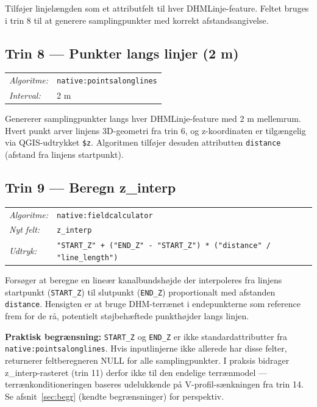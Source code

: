 \medskip
Tilføjer linjelængden som et attributfelt til hver DHMLinje-feature. Feltet
bruges i trin 8 til at generere samplingpunkter med korrekt afstandsangivelse.

\subsection{Trin 8 — Punkter langs linjer (2 m)}

\begin{tabular}{ll}
  \textit{Algoritme:} & \texttt{native:pointsalonglines} \\
  \textit{Interval:}  & 2 m \\
\end{tabular}

\medskip
Genererer samplingpunkter langs hver DHMLinje-feature med 2 m mellemrum.
Hvert punkt arver linjens 3D-geometri fra trin 6, og z-koordinaten er
tilgængelig via QGIS-udtrykket \texttt{\$z}. Algoritmen tilføjer desuden
attributten \texttt{distance} (afstand fra linjens startpunkt).

\subsection{Trin 9 — Beregn z\_interp}

\begin{tabular}{ll}
  \textit{Algoritme:} & \texttt{native:fieldcalculator} \\
  \textit{Nyt felt:}  & \texttt{z\_interp} \\
  \textit{Udtryk:}    & \texttt{"START\_Z" + ("END\_Z" - "START\_Z") * ("distance" / "line\_length")} \\
\end{tabular}

\medskip
Forsøger at beregne en lineær kanalbundshøjde der interpoleres fra linjens
startpunkt (\texttt{START\_Z}) til slutpunkt (\texttt{END\_Z}) proportionalt
med afstanden \texttt{distance}. Hensigten er at bruge DHM-terrænet i endepunkterne
som reference frem for de rå, potentielt støjbehæftede punkthøjder langs linjen.

\medskip
\textbf{Praktisk begrænsning:} \texttt{START\_Z} og \texttt{END\_Z} er ikke
standardattributter fra \texttt{native:pointsalonglines}. Hvis inputlinjerne ikke
allerede har disse felter, returnerer feltberegneren NULL for alle samplingpunkter.
I praksis bidrager z\_interp-rasteret (trin 11) derfor ikke til den endelige
terrænmodel — terrænkonditioneringen baseres udelukkende på V-profil-sænkningen
fra trin 14. Se afsnit~\ref{sec:begr} (kendte begrænsninger) for perspektiv.


